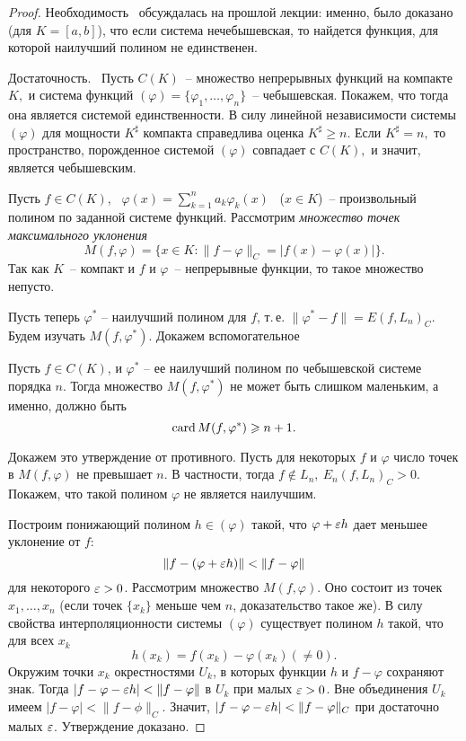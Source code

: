 \begin{proof}
Н\;е\;о\;б\;х\;о\;д\;и\;м\;о\;с\;т\;ь~ обсуждалась на прошлой лекции:
именно, было доказано (для $K=[a,b]$), что если система нечебышевская, то
найдется функция, для которой наилучший полином не единственен.

Д\;о\;с\;т\;а\;т\;о\;ч\;н\;о\;с\;т\;ь.~ Пусть $C(K)$~-- множество
непрерывных функций на компакте $K,$ и система функций $(\varphi) =
\{\varphi_1,\ldots,\varphi_n\}$~-- чебышевская. Покажем, что тогда
она является системой единственности. В силу линейной
независимости системы $(\varphi)$ для
мощности $K^\sharp$ компакта справедлива оценка $K^\sharp\ge
n.$ Если $K^{\sharp}=n,$ то пространство, порожденное
системой $(\varphi)$ совпадает с $C(K),$ и значит, является
чебышевским.

Пусть $f\in C(K)$,~ $\varphi(x)=\sum\limits_{k=1}^n a_k \varphi_k(x)$~
($x\in K$)~-- произвольный полином по заданной системе функций.
Рассмотрим \textit{множество точек максимального уклонения}
$$
M(f,\varphi) = \{x\in K\colon \|f-\varphi\|_C=|f(x)-\varphi(x)|\}.
$$
Так как $K$~-- компакт и $f$ и $\varphi$~-- непрерывные функции, то такое множество непусто.

Пусть теперь $\varphi^*$ -- наилучший полином для $f$, т.\,е.
$\|\varphi^*-f\|=E(f,{L_n})_C$. Будем изучать $M(f,\varphi^*)$. Докажем
вспомогательное

\begin{Proposition}\label{card_M}
Пусть $f\in C(K)$, и $\varphi^*$ -- ее наилучший полином по
чебышевской системе порядка $n.$ Тогда множество $M(f,\varphi^*)$ не может
быть слишком маленьким, а именно, должно быть
$$
\operatorname{card} M(f,\varphi^*)\geqslant n+1.
$$
\end{Proposition}

Докажем это утверждение от противного. Пусть для некоторых $f$ и
$\varphi$ число точек в $M(f,\varphi)$
не превышает $n$. В частности, тогда $f\notin L_n,\ E_n(f,L_n)_C>0.$
Покажем, что такой полином $\varphi$ не является наилучшим.

Построим понижающий полином $h\in (\varphi)$ такой, что $\varphi+\varepsilon h$
дает меньшее уклонение от $f$:
$$ \|f-(\varphi+\varepsilon h)\|<\|f-\varphi\| $$
для некоторого $\varepsilon > 0$. Рассмотрим множество $M(f,\varphi)$. Оно состоит
из точек $x_1,\ldots,x_n$ (если точек $\{x_k\}$ меньше чем $n$,
доказательство такое же). {В силу свойства} {интерполяционности
системы $(\varphi)$ существует} полином $h$ такой, что {для всех $x_k$}
$$
h(x_k) = f(x_k)-\varphi(x_k){(\ne 0)}.
$$
Окружим точки $x_k$ окрестностями $U_k$, в которых функции $h$ и $f-\varphi$
сохраняют знак. Тогда $|f-\varphi-\varepsilon h|<\|f-\varphi\|$ в $U_k$
при малых $\varepsilon>0$. Вне объединения $U_k$ имеем $|f-\varphi|<\|f-\phi\|_C$.
{Значит,} $|f-\varphi-\varepsilon h| < \|f-\varphi\|_C$ при достаточно
малых $\varepsilon$. Утверждение доказано.


\end{proof}
